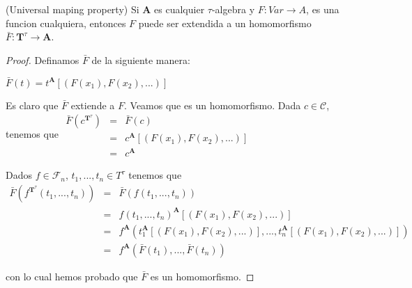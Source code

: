   \begin{lemma}
    (Universal maping property) Si \(\mathbf{A}\) es cualquier \(\tau \)-algebra y \( F:Var\rightarrow A\), es una funcion cualquiera, entonces \(F\) puede ser extendida a un homomorfismo \(\bar{F}:\mathbf{T}^{\tau }\rightarrow \mathbf{A} \).
  \end{lemma}
  \begin{proof}
    Definamos \(\bar{F}\) de la siguiente manera:

    \(\displaystyle \bar{F}(t)=t^{\mathbf{A}}[(F(x_{1}),F(x_{2}),...)] \)

    Es claro que \(\bar{F}\) extiende a \(F\). Veamos que es un homomorfismo. Dada \( c\in \mathcal{C}\), tenemos que
    \(\displaystyle \begin{array}{lll} \bar{F}(c^{\mathbf{T}^{\tau }}) & = & \bar{F}(c) \\ & = & c^{\mathbf{A}}[(F(x_{1}),F(x_{2}),...)] \\ & = & c^{\mathbf{A}} \end{array} \)

    Dados \(f\in \mathcal{F}_{n}\), \(t_{1},...,t_{n}\in T^{\tau }\) tenemos que
    \(\displaystyle \begin{array}{lll} \bar{F}(f^{\mathbf{T}^{\tau }}(t_{1},...,t_{n})) & = & \bar{F} (f(t_{1},...,t_{n})) \\ & = & f(t_{1},...,t_{n})^{\mathbf{A}}[(F(x_{1}),F(x_{2}),...)] \\ & = & f^{\mathbf{A}}(t_{1}^{\mathbf{A}}[(F(x_{1}),F(x_{2}),...)],...,t_{n}^{ \mathbf{A}}[(F(x_{1}),F(x_{2}),...)]) \\ & = & f^{\mathbf{A}}(\bar{F}(t_{1}),...,\bar{F}(t_{n})) \end{array} \)

    con lo cual hemos probado que \(\bar{F}\) es un homomorfismo.
  \end{proof}


